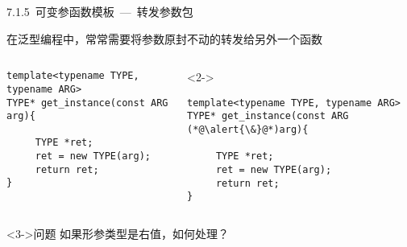 \begin{frame}[fragile]{7.1.5~可变参函数模板\normalsize{~---~转发参数包}}
\begin{block}{在泛型编程中，常常需要将参数原封不动的转发给另外一个函数}
\begin{columns}
\begin{lstlisting}[moreemph={T}]
template<typename TYPE, typename ARG>
TYPE* get_instance(const ARG arg){

     TYPE *ret;
     ret = new TYPE(arg);
     return ret;
}
\end{lstlisting}
\begin{onlyenv}<2->
\begin{lstlisting}[moreemph={T}]
template<typename TYPE, typename ARG>
TYPE* get_instance(const ARG  (*@\alert{\&}@*)arg){

     TYPE *ret;
     ret = new TYPE(arg);
     return ret;
}
\end{lstlisting}
\end{onlyenv}
\end{columns}
\end{block}

\begin{greenblock}<3->{问题}
如果形参类型是右值，如何处理？
\end{greenblock}
\end{frame}
